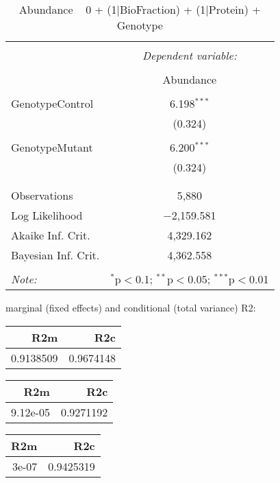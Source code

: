 \documentclass[11pt]{report}
\begin{document}
\begin{table}[!htbp] \centering 
  \caption{Abundance ~ 0 + (1|BioFraction) + (1|Protein) + Genotype} 
  \label{} 
\begin{tabular}{@{\extracolsep{5pt}}lc} 
\\[-1.8ex]\hline 
\hline \\[-1.8ex] 
 & \multicolumn{1}{c}{\textit{Dependent variable:}} \\ 
\cline{2-2} 
\\[-1.8ex] & Abundance \\ 
\hline \\[-1.8ex] 
 GenotypeControl & 6.198$^{***}$ \\ 
  & (0.324) \\ 
  & \\ 
 GenotypeMutant & 6.200$^{***}$ \\ 
  & (0.324) \\ 
  & \\ 
\hline \\[-1.8ex] 
Observations & 5,880 \\ 
Log Likelihood & $-$2,159.581 \\ 
Akaike Inf. Crit. & 4,329.162 \\ 
Bayesian Inf. Crit. & 4,362.558 \\ 
\hline 
\hline \\[-1.8ex] 
\textit{Note:}  & \multicolumn{1}{r}{$^{*}$p$<$0.1; $^{**}$p$<$0.05; $^{***}$p$<$0.01} \\ 
\end{tabular} 
\end{table} 
marginal (fixed effects) and conditional (total variance) R2:

\begin{tabular}{r|r}
\hline
R2m & R2c\\
\hline
0.9138509 & 0.9674148\\
\hline
\end{tabular}

\begin{tabular}{r|r}
\hline
R2m & R2c\\
\hline
9.12e-05 & 0.9271192\\
\hline
\end{tabular}

\begin{tabular}{r|r}
\hline
R2m & R2c\\
\hline
3e-07 & 0.9425319\\
\hline
\end{tabular}
\end{document}

